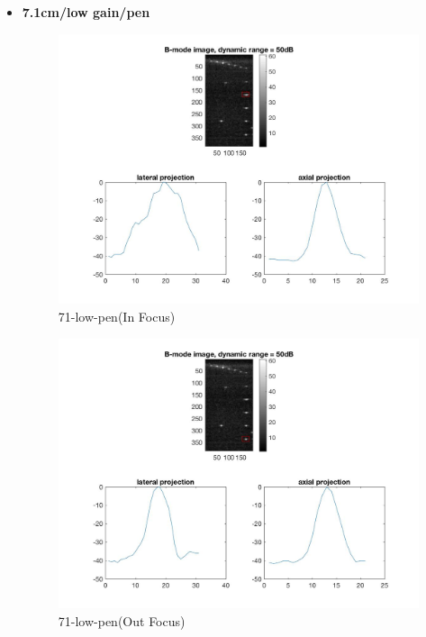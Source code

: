 \documentclass[12pts,a4paper]{article}
\begin{document}
\begin{itemize}
\pagebreak
\item{\textbf{7.1cm/low gain/pen}}
\begin{center}
\end{center}
\begin{figure}[h]
    \centering
    \includegraphics[width=1.0\textwidth]{img_hw1/71-low-pen1.jpg}
    \caption{71-low-pen(In Focus)}
    \label{fig:mesh1}
\end{figure}
\pagebreak
\begin{figure}[h]
    \centering
    \includegraphics[width=1.0\textwidth]{img_hw1/71-low-pen2.jpg}
    \caption{71-low-pen(Out Focus)}
    \label{fig:mesh1}
\end{figure}

\end{itemize}
\end{document}
